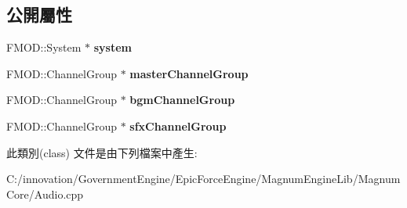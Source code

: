 \subsection*{公開屬性}
\begin{DoxyCompactItemize}
\item 
F\+M\+O\+D\+::\+System $\ast$ {\bfseries system}\hypertarget{class_audio_desc_aa316eaec3b6e99197fce5f7132b3395d}{}\label{class_audio_desc_aa316eaec3b6e99197fce5f7132b3395d}

\item 
F\+M\+O\+D\+::\+Channel\+Group $\ast$ {\bfseries master\+Channel\+Group}\hypertarget{class_audio_desc_a83367ee607202b2eca6d79369eb0dd16}{}\label{class_audio_desc_a83367ee607202b2eca6d79369eb0dd16}

\item 
F\+M\+O\+D\+::\+Channel\+Group $\ast$ {\bfseries bgm\+Channel\+Group}\hypertarget{class_audio_desc_aecfeed73e266d43e9653ca9731a1e7a0}{}\label{class_audio_desc_aecfeed73e266d43e9653ca9731a1e7a0}

\item 
F\+M\+O\+D\+::\+Channel\+Group $\ast$ {\bfseries sfx\+Channel\+Group}\hypertarget{class_audio_desc_a7c3a36c5dbc447e09e0b35916be3f971}{}\label{class_audio_desc_a7c3a36c5dbc447e09e0b35916be3f971}

\end{DoxyCompactItemize}


此類別(class) 文件是由下列檔案中產生\+:\begin{DoxyCompactItemize}
\item 
C\+:/innovation/\+Government\+Engine/\+Epic\+Force\+Engine/\+Magnum\+Engine\+Lib/\+Magnum\+Core/Audio.\+cpp\end{DoxyCompactItemize}
